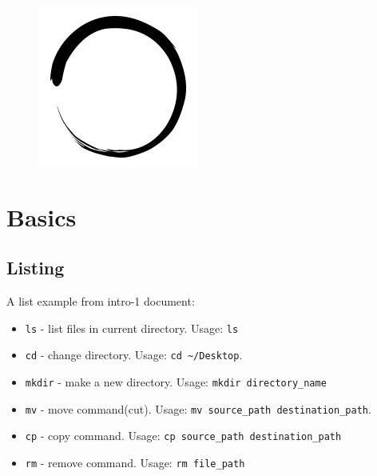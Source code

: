 \documentclass[12pt]{article}
\title{\vspace{-2em}\mytitle\vspace{-0.3em}}
\author{
	\textbf{Editor}\\
	Editor's Name  \\ \ \\ 
	\textbf{Reviewers} \\ 
	Reviewer's Name\\
	Reviewer's Name
}
\date{}
\begin{document}
	
	\begin{figure}
		\centering
		\includegraphics[width=\linewidth/4]{inzva-logo.png}
		\label{fig:inzva}
	\end{figure}
	\maketitle
	
	\cleardoublepage
	\tableofcontents
	\cleardoublepage
	
	\section{Basics}
	
	\subsection{Listing}
	
	A list example from intro-1 document:
	\begin{itemize}
		\item \texttt{ls} - list files in current directory. Usage: \texttt{ls}
		\item \texttt{cd} - change directory. Usage: \texttt{cd \textasciitilde/Desktop}.
		\item \texttt{mkdir} - make a new directory. Usage: \texttt{mkdir directory\_name}
		\item \texttt{mv} - move command(cut). Usage: \texttt{mv source\_path destination\_path}.
		\item \texttt{cp} - copy command. Usage: \texttt{cp source\_path destination\_path}
		\item \texttt{rm} - remove command. Usage: \texttt{rm file\_path}
	\end{itemize}
\end{document}
